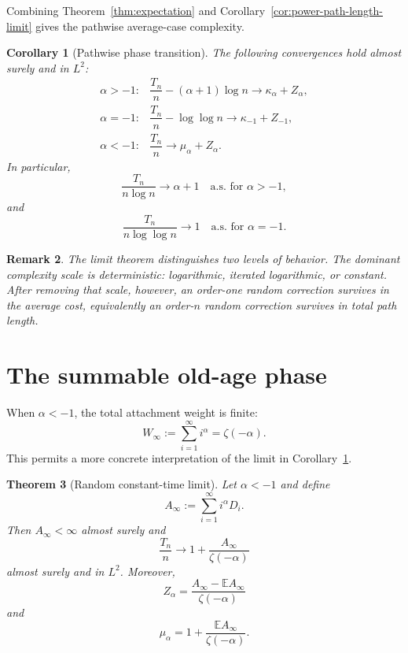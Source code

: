 \documentclass[11pt,a4paper]{article}
\newtheorem{theorem}{Theorem}[section]
\newtheorem{corollary}[theorem]{Corollary}
\newtheorem{remark}[theorem]{Remark}
\newcommand{\E}{\mathbb{E}}
\newcommand{\1}{\mathbf{1}}
\begin{document}
Combining Theorem~\ref{thm:expectation} and
Corollary~\ref{cor:power-path-length-limit} gives the pathwise average-case complexity.

\begin{corollary}[Pathwise phase transition]\label{cor:pathwise}
The following convergences hold almost surely and in $L^2$:
\[
\begin{array}{lll}
\alpha>-1:
&
\dfrac{T_n}{n}-(\alpha+1)\log n
\longrightarrow
\kappa_\alpha+Z_\alpha,
\\[4mm]
\alpha=-1:
&
\dfrac{T_n}{n}-\log\log n
\longrightarrow
\kappa_{-1}+Z_{-1},
\\[4mm]
\alpha<-1:
&
\dfrac{T_n}{n}
\longrightarrow
\mu_\alpha+Z_\alpha.
\end{array}
\]
In particular,
\[
\frac{T_n}{n\log n}\to\alpha+1
\quad\text{a.s. for }\alpha>-1,
\]
and
\[
\frac{T_n}{n\log\log n}\to1
\quad\text{a.s. for }\alpha=-1.
\]
\end{corollary}

\begin{remark}
The limit theorem distinguishes two levels of behavior.  The dominant
complexity scale is deterministic: logarithmic, iterated logarithmic, or
constant.  After removing that scale, however, an order-one random correction
survives in the average cost, equivalently an order-$n$ random correction
survives in total path length.
\end{remark}


\section{The summable old-age phase}\label{sec:oldage}

When $\alpha<-1$, the total attachment weight is finite:
\[
W_\infty
:=
\sum_{i=1}^\infty i^\alpha
=
\zeta(-\alpha).
\]
This permits a more concrete interpretation of the limit in
Corollary~\ref{cor:pathwise}.

\begin{theorem}[Random constant-time limit]\label{thm:old-random}
Let $\alpha<-1$ and define
\[
A_\infty
:=
\sum_{i=1}^\infty i^\alpha D_i.
\]
Then $A_\infty<\infty$ almost surely and
\begin{equation}\label{eq:old-pathwise}
\frac{T_n}{n}
\longrightarrow
1+\frac{A_\infty}{\zeta(-\alpha)}
\end{equation}
almost surely and in $L^2$.
Moreover,
\[
Z_\alpha
=
\frac{A_\infty-\E A_\infty}{\zeta(-\alpha)}
\]
and
\[
\mu_\alpha
=
1+\frac{\E A_\infty}{\zeta(-\alpha)}.
\]
\end{theorem}
\end{document}
